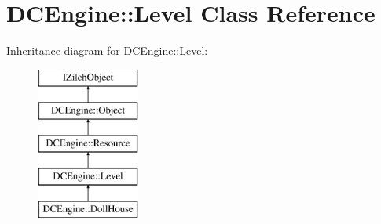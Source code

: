\hypertarget{classDCEngine_1_1Level}{\section{D\-C\-Engine\-:\-:Level Class Reference}
\label{classDCEngine_1_1Level}
}
Inheritance diagram for D\-C\-Engine\-:\-:Level\-:\begin{figure}[H]
\begin{center}
\leavevmode
\includegraphics[height=5.000000cm]{classDCEngine_1_1Level}
\end{center}
\end{figure}
